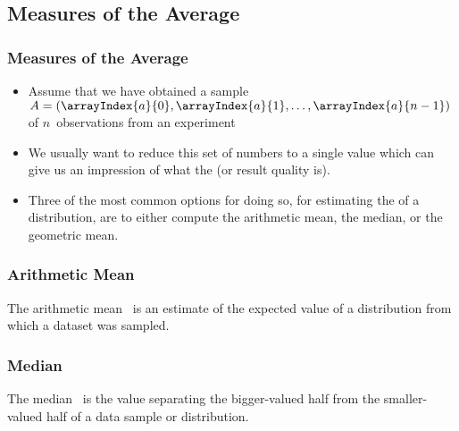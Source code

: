 \documentclass[aspectratio=169,mathserif,notheorems]{beamer}%
\begin{document}
\subsection{Measures of the Average}%
%
\begin{frame}%
\frametitle{Measures of the Average}%
\begin{itemize}%
\item Assume that we have obtained a sample~$A=(\arrayIndex{a}{0}, \arrayIndex{a}{1}, \dots, \arrayIndex{a}{n-1})$ of $n$~observations from an experiment%
\item<3-> We usually want to reduce this set of numbers to a single value which can give us an impression of what the  (or result quality is).%
\item<4-> Three of the most common options for doing so, for estimating the  of a distribution, are to either compute the \alert{arithmetic mean}, the \alert{median}, or the \alert{geometric mean}.%
\end{itemize}%
\end{frame}%
%
\begin{frame}%
\frametitle{Arithmetic Mean}%
%
\begin{definition*}%
The arithmetic mean~ is an \alert{estimate} of the expected value of a distribution from which a dataset was sampled.%
%
\end{definition*}%
\end{frame}%
%
\begin{frame}%
\frametitle{Median}%
\begin{definition*}[Median]%
The median~ is the value separating the bigger-valued half from the smaller-valued half of a data sample or distribution.%
%
\end{definition*}%
%
\end{frame}%
\end{document}
